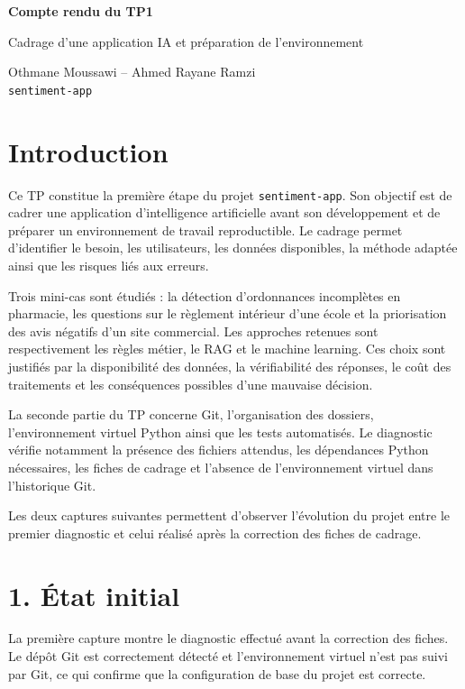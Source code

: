 \documentclass[11pt,a4paper]{article}
\begin{document}
\begin{center}
{\Large\bfseries Compte rendu du TP1}\par
\vspace{0.2cm}
{\normalsize Cadrage d'une application IA et préparation de l'environnement}\par
\vspace{0.15cm}
Othmane Moussawi -- Ahmed Rayane Ramzi\\
\texttt{sentiment-app}
\end{center}

\section*{Introduction}

Ce TP constitue la première étape du projet \texttt{sentiment-app}. Son objectif est de cadrer une application d'intelligence artificielle avant son développement et de préparer un environnement de travail reproductible. Le cadrage permet d'identifier le besoin, les utilisateurs, les données disponibles, la méthode adaptée ainsi que les risques liés aux erreurs.

Trois mini-cas sont étudiés : la détection d'ordonnances incomplètes en pharmacie, les questions sur le règlement intérieur d'une école et la priorisation des avis négatifs d'un site commercial. Les approches retenues sont respectivement les règles métier, le RAG et le machine learning. Ces choix sont justifiés par la disponibilité des données, la vérifiabilité des réponses, le coût des traitements et les conséquences possibles d'une mauvaise décision.

La seconde partie du TP concerne Git, l'organisation des dossiers, l'environnement virtuel Python ainsi que les tests automatisés. Le diagnostic vérifie notamment la présence des fichiers attendus, les dépendances Python nécessaires, les fiches de cadrage et l'absence de l'environnement virtuel dans l'historique Git.

Les deux captures suivantes permettent d'observer l'évolution du projet entre le premier diagnostic et celui réalisé après la correction des fiches de cadrage.

\section*{1. État initial}

La première capture montre le diagnostic effectué avant la correction des fiches. Le dépôt Git est correctement détecté et l'environnement virtuel n'est pas suivi par Git, ce qui confirme que la configuration de base du projet est correcte.
\end{document}
